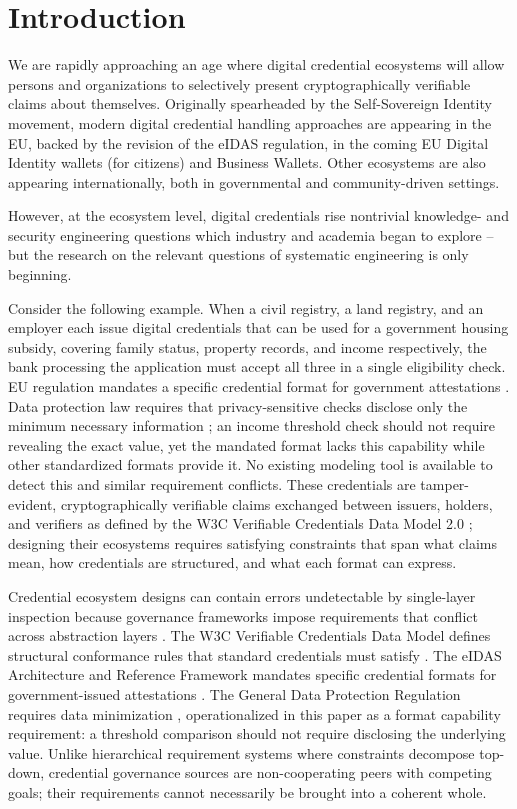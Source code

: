 \section{Introduction}\label{sec:introduction}
We are rapidly approaching an age where digital credential ecosystems will allow persons and organizations to selectively present cryptographically verifiable claims about themselves. Originally spearheaded by the Self-Sovereign Identity movement, modern digital credential handling approaches are appearing in the EU, backed by the revision of the eIDAS regulation, in the coming EU Digital Identity wallets (for citizens) and Business Wallets. Other ecosystems are also appearing internationally, both in governmental and community-driven settings.

However, at the ecosystem level, digital credentials rise nontrivial knowledge- and security engineering questions which industry and academia began to explore -- but the research on the relevant questions of systematic engineering is only beginning.

Consider the following example. When a civil registry, a land registry, and an employer each issue digital credentials that can be used for a government housing subsidy, covering family status, property records, and income respectively, the bank processing the application must accept all three in a single eligibility check. EU regulation mandates a specific credential format for government attestations \citep{eidas2}. Data protection law requires that privacy-sensitive checks disclose only the minimum necessary information \citep{gdpr}; an income threshold check should not require revealing the exact value, yet the mandated format lacks this capability while other standardized formats provide it. No existing modeling tool is available to detect this and similar requirement conflicts. These credentials are tamper-evident, cryptographically verifiable claims exchanged between issuers, holders, and verifiers as defined by the W3C Verifiable Credentials Data Model 2.0 \citep{sporny_verifiable_2025}; designing their ecosystems requires satisfying constraints that span what claims mean, how credentials are structured, and what each format can express.

Credential ecosystem designs can contain errors undetectable by single-layer inspection because governance frameworks impose requirements that conflict across abstraction layers \citep{mazzocca_survey_2025}. The W3C Verifiable Credentials Data Model defines structural conformance rules that standard credentials must satisfy \citep{sporny_verifiable_2025}. The eIDAS Architecture and Reference Framework mandates specific credential formats for government-issued attestations \citep{noauthor_eu-digital-identity-walleteudi-doc-architecture-and-reference-framework_2026}. The General Data Protection Regulation requires data minimization \citep{gdpr}, operationalized in this paper as a format capability requirement: a threshold comparison should not require disclosing the underlying value. Unlike hierarchical requirement systems where constraints decompose top-down, credential governance sources are non-cooperating peers with competing goals; their requirements cannot necessarily be brought into a coherent whole.

